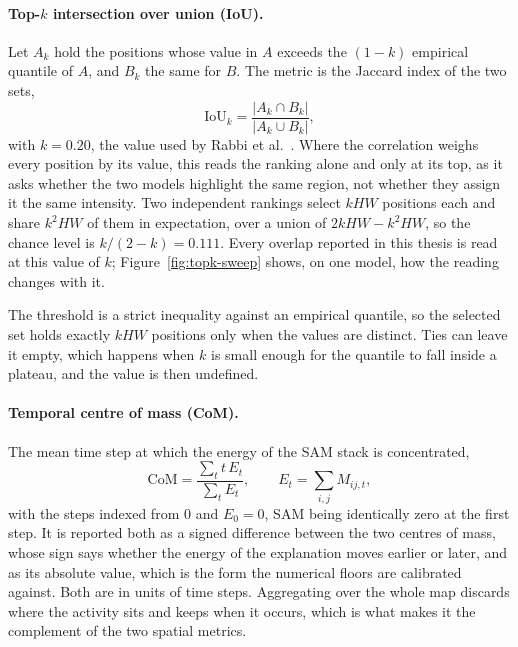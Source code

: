 \paragraph{Top-$k$ intersection over union (IoU).} Let $A_k$ hold the positions
whose value in $A$ exceeds the $(1-k)$ empirical quantile of $A$, and $B_k$ the
same for $B$. The metric is the Jaccard index of the two sets,
\begin{equation}
\mathrm{IoU}_k = \frac{|A_k \cap B_k|}{|A_k \cup B_k|},
\label{eq:iou}
\end{equation}
with $k = 0.20$, the value used by Rabbi et al.~\cite{rabbi2026}. Where the
correlation weighs every position by its value, this reads the ranking alone
and only at its top, as it asks whether the two models highlight the same region,
not whether they assign it the same intensity. Two independent rankings select
$kHW$ positions each and share $k^{2}HW$ of them in expectation, over a union
of $2kHW - k^{2}HW$, so the chance level is $k/(2-k) = 0.111$.
Every overlap reported in this thesis is read at this value of $k$;
Figure~\ref{fig:topk-sweep} shows, on one model, how the reading changes with it.

The threshold is
a strict inequality against an empirical quantile, so the selected set holds
exactly $kHW$ positions only when the values are distinct. Ties can leave it
empty, which happens when $k$ is small enough for the quantile to fall inside a
plateau, and the value is then undefined.

\paragraph{Temporal centre of mass (CoM).} The mean time step at which the
energy of the SAM stack is concentrated,
\begin{equation}
\mathrm{CoM} = \frac{\sum_t t \, E_t}{\sum_t E_t},
\qquad E_t = \sum_{i,j} M_{ij,t},
\label{eq:com}
\end{equation}
with the steps indexed from $0$ and $E_0 = 0$, SAM being identically zero at
the first step. It is reported both as a signed difference between the two
centres of mass, whose sign says whether the energy of the explanation moves
earlier or later, and as its absolute value, which is the form the numerical
floors are calibrated against. Both are in units of time steps. Aggregating over
the whole map discards where the activity sits and keeps when it occurs, which
is what makes it the complement of the two spatial metrics.

